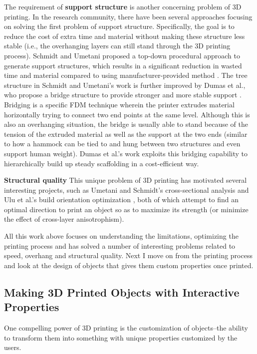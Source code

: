 The requirement of \textbf{support structure} is another concerning problem of 3D printing. In the research community, there have been several approaches focusing on solving the first problem of support structure. Specifically, the goal is to reduce the cost of extra time and material without making these structure less stable (i.e., the overhanging layers can still stand through the 3D printing process). Schmidt and Umetani proposed a top-down procedural approach to generate support structures, which results in a significant reduction in wasted time and material compared to using manufacturer-provided method \cite{schmidt2014branching}. The tree structure in Schmidt and Umetani's work is further improved by Dumas et al., who propose a bridge structure to provide stronger and more stable support \cite{dumas2014bridging}. Bridging is a specific FDM technique wherein the printer extrudes material horizontally trying to connect two end points at the same level. Although this is also an overhanging situation, the bridge is usually able to stand because of the tension of the extruded material as well as the support at the two ends (similar to how a hammock can be tied to and hung between two structures and even support human weight). Dumas et al.'s work exploits this bridging capability to hierarchically build up steady scaffolding in a cost-efficient way.

\textbf{Structural quality} This unique problem of 3D printing has motivated several interesting projects, such as Umetani and Schmidt's cross-sectional analysis \cite{umetani2013cross} and Ulu et al.'s build orientation optimization \cite{ulu2015enhancing}, both of which attempt to find an optimal direction to print an object so as to maximize its strength (or minimize the effect of cross-layer anisotrophism).

All this work above focuses on understanding the limitations, optimizing the printing process and has solved a number of interesting problems related to speed, overhang and structural quality. Next I move on from the printing process and look at the design of objects that gives them custom properties once printed.

\subsection{Making 3D Printed Objects with Interactive Properties}
One compelling power of 3D printing is the customization of objects--the ability to transform them into something with unique properties customized by the users. 

